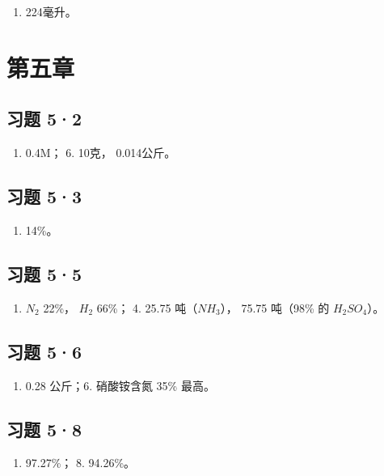 \begin{enumerate}[start=6]
\item
  224毫升。
\end{enumerate}

\section{第五章}

\subsection{习题 5·2}

\begin{enumerate}[start=5]
\item
  0.4M； 6. 10克， 0.014公斤。
\end{enumerate}

\subsection{习题 5·3}

\begin{enumerate}[start=5]
\item
  14\%。
\end{enumerate}

\subsection{习题 5·5}

\begin{enumerate}[start=3]
\item
  \(N_{2}\) 22\%， \(H_{2}\) 66\%； 4. 25.75 吨（\(NH_{3}\)）， 75.75
  吨（98\% 的 \(H_{2}SO_{4}\)）。
\end{enumerate}

\subsection{习题 5·6}

\begin{enumerate}[start=3]
\item
  0.28 公斤；6. 硝酸铵含氮 35\% 最高。
\end{enumerate}

\subsection{习题 5·8}

\begin{enumerate}[start=6]
\item
  97.27\%； 8. 94.26\%。
\end{enumerate}

